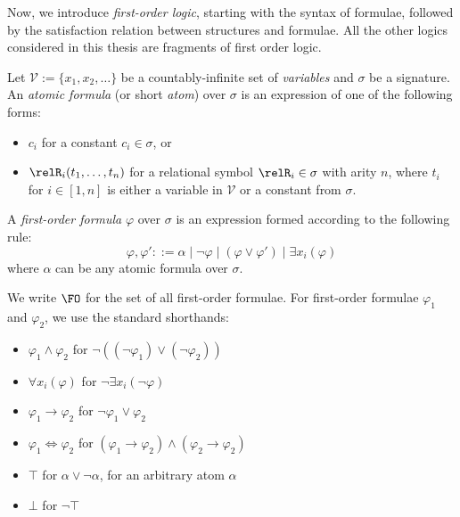 Now, we introduce \emph{first-order logic}, starting with the syntax of formulae, followed by the satisfaction relation between structures and formulae.
All the other logics considered in this thesis are fragments of first order logic.
\begin{definition}
  Let $\mathcal{V} := \{x_{1}, x_{2}, \ldots\}$ be a countably-infinite set of \emph{variables} and $\sigma$ be a signature.
  An \emph{atomic formula} (or short \emph{atom}) over $\sigma$ is an expression of one of the following forms:
  \begin{itemize}
    \item $c_{i}$ for a constant $c_{i} \in \sigma$, or
    \item $\relR_{i}(t_{1}, \ldots, t_{n})$ for a relational symbol $\relR_{i} \in \sigma$ with arity $n$, where $t_{i}$ for $i \in [1,n]$ is either a variable in $\mathcal{V}$ or a constant from $\sigma$.
  \end{itemize}
  A \emph{first-order formula} $\varphi$ over $\sigma$ is an expression formed according to the following rule:
  \begin{equation*}
    \varphi, \varphi' ::= \alpha
      \mid \neg \varphi
      \mid (\varphi \lor \varphi')
      \mid \exists{x_{i}}(\varphi)
  \end{equation*}
  where $\alpha$ can be any atomic formula over $\sigma$.
\end{definition}
We write $\FO$ for the set of all first-order formulae.
For first-order formulae $\varphi_{1}$ and $\varphi_{2}$, we use the standard shorthands:
\begin{multicols}{2}
  \begin{itemize}
    \item $\varphi_{1} \land \varphi_{2}$ for $\neg ((\neg \varphi_{1}) \lor (\neg \varphi_{2}))$
    \item $\forall{x_{i}}(\varphi)$ for $\neg\exists{x_{i}}(\neg \varphi)$
    \item $\varphi_{1} \to \varphi_{2}$ for $\neg \varphi_{1} \lor \varphi_{2}$
    \item $\varphi_{1} \iff \varphi_{2}$ for $(\varphi_{1} \to \varphi_{2}) \land (\varphi_{2} \to \varphi_{2})$
    \item $\top$ for $\alpha \lor \neg \alpha$, for an arbitrary atom $\alpha$
    \item $\bot$ for $\neg \top$
  \end{itemize}
\end{multicols}
